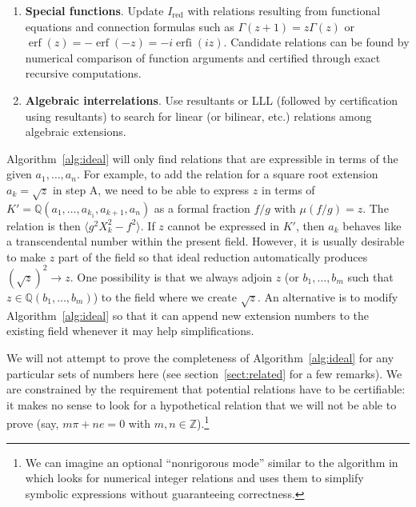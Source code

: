 \documentclass[sigconf,screen,urlbreakonhyphens]{acmart}
\begin{document}
\begin{algorithm}
\begin{enumerate}[{A}]
\item \textbf{Special functions}. Update $I_{\text{red}}$ with relations
resulting
from functional equations and connection formulas such as $\Gamma(z+1) = z \Gamma(z)$
or $\operatorname{erf}(z) = -\operatorname{erf}(-z) = -i \operatorname{erfi}(i z)$.
Candidate relations can be found by numerical comparison of function arguments
and certified through exact recursive computations.

\item \textbf{Algebraic interrelations}. Use resultants or LLL (followed by certification
using resultants) to search for linear (or bilinear, etc.) relations
among algebraic extensions.

\end{enumerate}

\label{alg:ideal}
\end{algorithm}

Algorithm~\ref{alg:ideal} will only find relations
that are expressible in terms of the given
$a_1,\ldots,a_n$.
For example, to add the relation
for a square root extension $a_k = \sqrt{z}$ in step A,
we need to be able to express $z$ in terms
of $K' = \mathbb{Q}(a_1,\ldots,a_{k_1},a_{k+1},a_n)$
as a formal fraction $f/g$ with $\mu(f / g) = z$.
The relation is then $\langle g^2 X_k^2 - f^2 \rangle$.
If $z$ cannot be expressed in $K'$, then $a_k$
behaves like a transcendental number within the present field.
However, it is usually desirable to make $z$ part of the field
so that ideal reduction automatically produces $(\sqrt{z})^2 \rightarrow z$.
One possibility is that we always adjoin $z$ (or $b_1,\ldots,b_m$
such that $z \in \mathbb{Q}(b_1,\ldots,b_m)$) to the field
where we create $\sqrt{z}$.
An alternative is to modify Algorithm~\ref{alg:ideal} so that it
can append new extension numbers to the existing field
whenever it may help simplifications.


We will not attempt to prove the completeness of
Algorithm~\ref{alg:ideal} for any particular sets of numbers here
(see section~\ref{sect:related} for a few remarks).
We are constrained by the requirement
that potential relations have to be certifiable:
it makes no sense to look for a hypothetical relation that we will
not be able to prove (say, $m \pi + n e = 0$ with $m, n \in \mathbb{Z}$).\footnote{We can imagine an optional ``nonrigorous mode''
similar to the algorithm in \cite{BBK2014} which looks for
numerical integer relations and uses them to simplify
symbolic expressions without guaranteeing correctness.}
\end{document}
